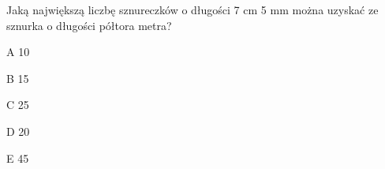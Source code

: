 \begin{tresc}
Jaką największą liczbę sznureczków o długości 7 cm 5 mm można uzyskać ze sznurka o długości półtora metra?
\end{tresc}
\begin{wariant}{A} 10 \end{wariant}
\begin{wariant}{B} 15 \end{wariant}
\begin{wariant}{C} 25 \end{wariant}
\begin{wariant}{D} 20 \end{wariant}
\begin{wariant}{E} 45 \end{wariant}
